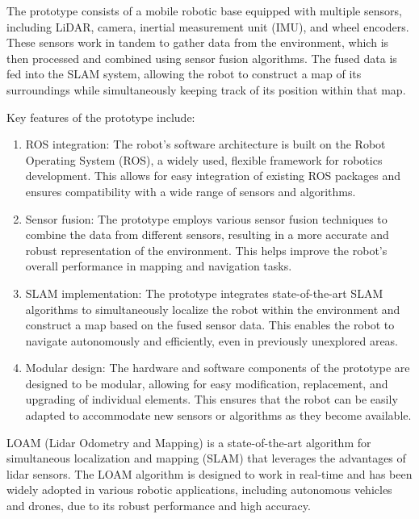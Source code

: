 \documentclass[12pt]{article}
\begin{document}
The prototype consists of a mobile robotic base equipped with multiple sensors, including LiDAR, camera, inertial measurement unit (IMU), and wheel encoders. These sensors work in tandem to gather data from the environment, which is then processed and combined using sensor fusion algorithms. The fused data is fed into the SLAM system, allowing the robot to construct a map of its surroundings while simultaneously keeping track of its position within that map.

Key features of the prototype include:

\begin{enumerate}
    \item ROS integration: The robot's software architecture is built on the Robot Operating System (ROS), a widely used, flexible framework for robotics development. This allows for easy integration of existing ROS packages and ensures compatibility with a wide range of sensors and algorithms.
          
    \item Sensor fusion: The prototype employs various sensor fusion techniques to combine the data from different sensors, resulting in a more accurate and robust representation of the environment. This helps improve the robot's overall performance in mapping and navigation tasks.
          
    \item SLAM implementation: The prototype integrates state-of-the-art SLAM algorithms to simultaneously localize the robot within the environment and construct a map based on the fused sensor data. This enables the robot to navigate autonomously and efficiently, even in previously unexplored areas.
          
    \item Modular design: The hardware and software components of the prototype are designed to be modular, allowing for easy modification, replacement, and upgrading of individual elements. This ensures that the robot can be easily adapted to accommodate new sensors or algorithms as they become available.
\end{enumerate}

LOAM (Lidar Odometry and Mapping) is a state-of-the-art algorithm for simultaneous localization and mapping (SLAM) that leverages the advantages of lidar sensors. The LOAM algorithm is designed to work in real-time and has been widely adopted in various robotic applications, including autonomous vehicles and drones, due to its robust performance and high accuracy.
\end{document}
